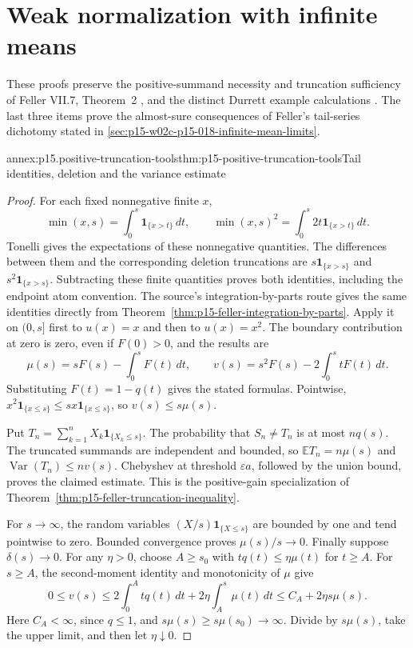 \section{Weak normalization with infinite means}
\label{sec:annex-p15-infinite-mean-weak-normalization}

These proofs preserve the positive-summand necessity and truncation
sufficiency of Feller VII.7, Theorem~2
\cite[pp.~236--237]{Feller1971ProbabilityII}, and the distinct
Durrett example calculations
\cite[pp.~65--66]{DurrettPTEAuthor2019}.
The last three items prove the almost-sure consequences of Feller's
tail-series dichotomy stated in
\cref{sec:p15-w02c-p15-018-infinite-mean-limits}.

\begin{annexitem}{annex:p15.positive-truncation-tools}{thm:p15-positive-truncation-tools}{Tail identities, deletion and the variance estimate}
\begin{proof}
For each fixed nonnegative finite \(x\),
\[
 \min(x,s)=\int_0^s\mathbf1_{\{x>t\}}\,dt,\qquad
 \min(x,s)^2=\int_0^s2t\mathbf1_{\{x>t\}}\,dt.
\]
Tonelli gives the expectations of these nonnegative quantities.
The differences between them and the corresponding deletion
truncations are \(s\mathbf1_{\{x>s\}}\) and
\(s^2\mathbf1_{\{x>s\}}\). Subtracting these finite quantities
proves both identities, including the endpoint atom convention.
The source's integration-by-parts route gives the same identities
directly from Theorem~\ref{thm:p15-feller-integration-by-parts}.
Apply it on \((0,s]\) first to \(u(x)=x\) and then to
\(u(x)=x^2\). The boundary contribution at zero is zero, even if
\(F(0)>0\), and the results are
\[
 \mu(s)=sF(s)-\int_0^s F(t)\,dt,\qquad
 v(s)=s^2F(s)-2\int_0^s tF(t)\,dt.
\]
Substituting \(F(t)=1-q(t)\) gives the stated formulas.
Pointwise, \(x^2\mathbf1_{\{x\leq s\}}\leq
sx\mathbf1_{\{x\leq s\}}\), so \(v(s)\leq s\mu(s)\).

Put \(T_n=\sum_{k=1}^nX_k\mathbf1_{\{X_k\leq s\}}\).
The probability that \(S_n\ne T_n\) is at most \(nq(s)\).
The truncated summands are independent and bounded, so
\(\mathbb ET_n=n\mu(s)\) and
\(\operatorname{Var}(T_n)\leq nv(s)\).
Chebyshev at threshold \(\varepsilon a\), followed by the union
bound, proves the claimed estimate. This is the positive-gain
specialization of Theorem~\ref{thm:p15-feller-truncation-inequality}.

For \(s\to\infty\), the random variables
\((X/s)\mathbf1_{\{X\leq s\}}\) are bounded by one and tend
pointwise to zero. Bounded convergence proves \(\mu(s)/s\to0\).
Finally suppose \(\delta(s)\to0\). For any \(\eta>0\), choose
\(A\geq s_0\) with \(tq(t)\leq\eta\mu(t)\) for \(t\geq A\).
For \(s\geq A\), the second-moment identity and monotonicity of
\(\mu\) give
\[
 0\leq v(s)\leq
 2\int_0^A tq(t)\,dt+2\eta\int_A^s\mu(t)\,dt
 \leq C_A+2\eta s\mu(s).
\]
Here \(C_A<\infty\), since \(q\leq1\), and
\(s\mu(s)\geq s\mu(s_0)\to\infty\).
Divide by \(s\mu(s)\), take the upper limit, and then let
\(\eta\downarrow0\).
\end{proof}
\end{annexitem}

